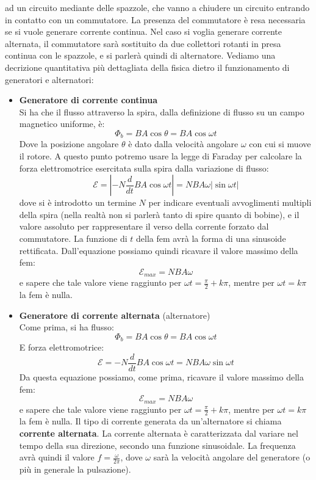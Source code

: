 \documentclass[a4paper,12pt]{article}
\begin{document}
ad un circuito mediante delle spazzole, che vanno a chiudere un circuito entrando in contatto con un commutatore. La presenza
del commutatore è resa necessaria se si vuole generare corrente continua. Nel caso si voglia generare corrente alternata,
il commutatore sarà sostituito da due collettori rotanti in presa continua con le spazzole, e si parlerà quindi di alternatore.
Vediamo una decrizione quantitativa più dettagliata della fisica dietro il funzionamento di generatori e alternatori:
\begin{itemize}
  \item \textbf{Generatore di corrente continua} \\
    Si ha che il flusso attraverso la spira, dalla definizione di flusso su un campo magnetico uniforme, è:
    $$ \Phi_b = BA\cos{\theta} = BA\cos{\omega t}$$
    Dove la posizione angolare $\theta$ è dato dalla velocità angolare $\omega$ con cui si muove il rotore. A
    questo punto potremo usare la legge di Faraday per calcolare la forza elettromotrice esercitata sulla spira
    dalla variazione di flusso:
    $$ \mathcal{E} = |-N \frac{d}{dt}BA\cos{\omega t}| = NBA\omega |\sin{\omega t}| $$
    dove si è introdotto un termine $N$ per indicare eventuali avvoglimenti multipli della spira (nella realtà
    non si parlerà tanto di spire quanto di bobine), e il valore assoluto per rappresentare il verso
    della corrente forzato dal commutatore. La funzione di $t$ della fem avrà la forma di una sinusoide rettificata.
    Dall'equazione possiamo quindi ricavare il valore massimo della fem:
    $$ \mathcal{E}_{max} = NBA\omega $$
    e sapere che tale valore viene raggiunto per $\omega t = \frac{\pi}{2} + k\pi $, mentre per $\omega t  = k\pi$
    la fem è nulla.
  \item \textbf{Generatore di corrente alternata} (alternatore) \\
    Come prima, si ha flusso:
    $$ \Phi_b = BA\cos{\theta} = BA\cos{\omega t}$$
    E forza elettromotrice:
    $$ \mathcal{E} = -N \frac{d}{dt}BA\cos{\omega t} = NBA\omega \sin{\omega t} $$
    Da questa equazione possiamo, come prima, ricavare il valore massimo della fem:
    $$ \mathcal{E}_{max} = NBA\omega $$
    e sapere che tale valore viene raggiunto per $\omega t = \frac{\pi}{2} + k\pi $, mentre per $\omega t  = k\pi$
    la fem è nulla. Il tipo di corrente generata da un'alternatore si chiama \textbf{corrente alternata}. La corrente
    alternata è caratterizzata dal variare nel tempo della sua direzione, secondo una funzione sinusoidale. La frequenza
    avrà quindi il valore $f = \frac{\omega}{2\pi}$, dove $\omega$ sarà la velocità angolare del generatore (o più in
    generale la pulsazione).
\end{itemize}
\end{document}
